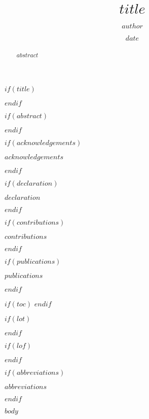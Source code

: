 \documentclass[11pt,twoside]{bristolthesis}
\title{$title$}
\author{$author$}
\date{$date$}
\newcommand\blankpage{%
    \null
    \thispagestyle{empty}%
    \addtocounter{page}{-1}%
    \newpage}
\begin{document}
$if(title)$
  \maketitle
$endif$

\frontmatter %
\pagestyle{empty} %
\begingroup

$if(abstract)$
  \begin{abstract}
    $abstract$
  \end{abstract}
$endif$

$if(acknowledgements)$
  \begin{acknowledgements}
    $acknowledgements$
  \end{acknowledgements}
$endif$

$if(declaration)$
  \begin{declaration}
    $declaration$
  \end{declaration}
$endif$

$if(contributions)$
  \begin{contributions}
    $contributions$
  \end{contributions}
$endif$

$if(publications)$
  \begin{publications}
    $publications$
    \afterpage{\blankpage}
  \end{publications}
$endif$

$if(toc)$
  \hypersetup{linkcolor=$if(toccolor)$$toccolor$$else$black$endif$}
  {
  \setcounter{tocdepth}{$toc-depth$}
  \setcounter{secnumdepth}{$toc-depth$}
  \tableofcontents
  }
  \afterpage{\blankpage}
$endif$

$if(lot)$
  \listoftables
  \afterpage{\blankpage}
$endif$

$if(lof)$
  \listoffigures
  \afterpage{\blankpage}
$endif$

$if(abbreviations)$
  \begin{abbreviations}
    $abbreviations$
  \end{abbreviations}
$endif$

\endgroup


\mainmatter %
\pagestyle{plain}

$body$
\end{document}
